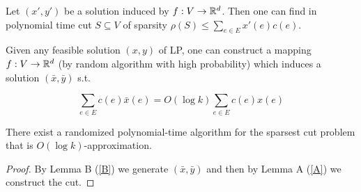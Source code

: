 \begin{lemma}[A]\label{A}
	Let $(x',y')$ be a solution induced by $f : V \to \mathbb{R}^{d}$. Then one can find in polynomial time cut $S \subseteq V$ of sparsity $\rho(S) \leq \sum_{e \in E} x'(e) c(e)$.
\end{lemma}

\begin{lemma}[B]\label{B}
	Given any feasible solution $(x,y)$ of LP, one can construct a mapping $f: V \to \mathbb{R}^{d}$ (by random algorithm with high probability) which induces a solution $(\bar{x}, \bar{y})$ s.t.
	
	$$
	\sum_{e \in E} c(e) \bar{x}(e) = O(\log k) \sum_{e \in E} c(e) x(e)
	$$
\end{lemma}

\begin{thm}
	There exist a randomized polynomial-time algorithm for the sparsest cut problem that is $O(\log k)$-approximation.
\end{thm}

\begin{proof}
	By Lemma B (\ref{B}) we generate $(\bar{x}, \bar{y})$ and then by Lemma A (\ref{A}) we construct the cut.
\end{proof}


